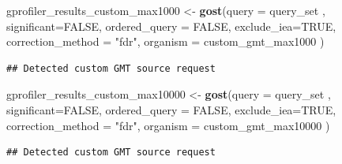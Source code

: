 \documentclass[
]{book}
\newenvironment{Shaded}{\begin{snugshade}}{\end{snugshade}}
\newcommand{\AttributeTok}[1]{\textcolor[rgb]{0.13,0.29,0.53}{#1}}
\newcommand{\CommentTok}[1]{\textcolor[rgb]{0.56,0.35,0.01}{\textit{#1}}}
\newcommand{\ConstantTok}[1]{\textcolor[rgb]{0.56,0.35,0.01}{#1}}
\newcommand{\DecValTok}[1]{\textcolor[rgb]{0.00,0.00,0.81}{#1}}
\newcommand{\FunctionTok}[1]{\textcolor[rgb]{0.13,0.29,0.53}{\textbf{#1}}}
\newcommand{\NormalTok}[1]{#1}
\newcommand{\OtherTok}[1]{\textcolor[rgb]{0.56,0.35,0.01}{#1}}
\newcommand{\SpecialCharTok}[1]{\textcolor[rgb]{0.81,0.36,0.00}{\textbf{#1}}}
\newcommand{\StringTok}[1]{\textcolor[rgb]{0.31,0.60,0.02}{#1}}
\begin{document}
\begin{Shaded}
\begin{Highlighting}[]
\NormalTok{gprofiler\_results\_custom\_max1000 }\OtherTok{\textless{}{-}} \FunctionTok{gost}\NormalTok{(}\AttributeTok{query =}\NormalTok{ query\_set ,}
                                     \AttributeTok{significant=}\ConstantTok{FALSE}\NormalTok{,}
                                      \AttributeTok{ordered\_query =} \ConstantTok{FALSE}\NormalTok{,}
                                      \AttributeTok{exclude\_iea=}\ConstantTok{TRUE}\NormalTok{,}
                                     \AttributeTok{correction\_method =} \StringTok{"fdr"}\NormalTok{,}
                                 \AttributeTok{organism =}\NormalTok{ custom\_gmt\_max1000}
\NormalTok{                                     )}
\end{Highlighting}
\end{Shaded}

\begin{verbatim}
## Detected custom GMT source request
\end{verbatim}

\begin{Shaded}
\begin{Highlighting}[]
\NormalTok{gprofiler\_results\_custom\_max10000 }\OtherTok{\textless{}{-}} \FunctionTok{gost}\NormalTok{(}\AttributeTok{query =}\NormalTok{ query\_set ,}
                                     \AttributeTok{significant=}\ConstantTok{FALSE}\NormalTok{,}
                                      \AttributeTok{ordered\_query =} \ConstantTok{FALSE}\NormalTok{,}
                                      \AttributeTok{exclude\_iea=}\ConstantTok{TRUE}\NormalTok{,}
                                     \AttributeTok{correction\_method =} \StringTok{"fdr"}\NormalTok{,}
                                 \AttributeTok{organism =}\NormalTok{ custom\_gmt\_max10000}
\NormalTok{                                     )}
\end{Highlighting}
\end{Shaded}

\begin{verbatim}
## Detected custom GMT source request
\end{verbatim}

\begin{Shaded}
\end{Shaded}
\end{document}
